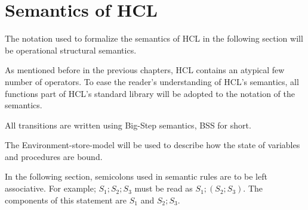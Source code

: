 
\section{Semantics of HCL}

The notation used to formalize the semantics of HCL in the following section will be operational structural semantics.

As mentioned before in the previous chapters, HCL contains an atypical few number of operators.
To ease the reader's understanding of HCL's semantics, all functions part of HCL's standard library will be adopted to the notation of the semantics. 

All transitions are written using Big-Step semantics, BSS for short.

The Environment-store-model will be used to describe how the state of variables and procedures are bound.

In the following section, semicolons used in semantic rules are to be left associative.
For example; $S_1;S_2;S_3$ must be read as $S_1;(S_2;S_3)$.
The components of this statement are $S_1$ and $S_2;S_3$.

